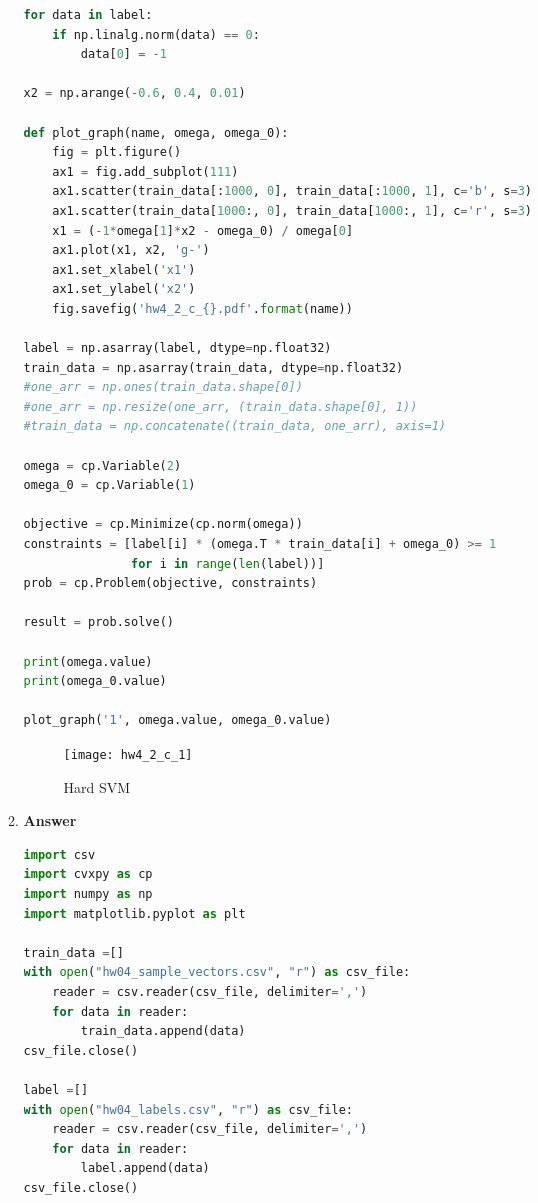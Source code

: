 \documentclass[11pt]{article}
\begin{document}
\begin{enumerate}[label=(\alph*)]
\begin{enumerate}[label=(\roman*)]
\begin{lstlisting}[language=Python, showstringspaces=false]
for data in label:
    if np.linalg.norm(data) == 0:
        data[0] = -1
        
x2 = np.arange(-0.6, 0.4, 0.01)
        
def plot_graph(name, omega, omega_0):
    fig = plt.figure()
    ax1 = fig.add_subplot(111)
    ax1.scatter(train_data[:1000, 0], train_data[:1000, 1], c='b', s=3)
    ax1.scatter(train_data[1000:, 0], train_data[1000:, 1], c='r', s=3)
    x1 = (-1*omega[1]*x2 - omega_0) / omega[0]
    ax1.plot(x1, x2, 'g-')
    ax1.set_xlabel('x1')
    ax1.set_ylabel('x2')
    fig.savefig('hw4_2_c_{}.pdf'.format(name))
        
label = np.asarray(label, dtype=np.float32)
train_data = np.asarray(train_data, dtype=np.float32)
#one_arr = np.ones(train_data.shape[0])
#one_arr = np.resize(one_arr, (train_data.shape[0], 1))
#train_data = np.concatenate((train_data, one_arr), axis=1)

omega = cp.Variable(2)
omega_0 = cp.Variable(1)

objective = cp.Minimize(cp.norm(omega))
constraints = [label[i] * (omega.T * train_data[i] + omega_0) >= 1  
               for i in range(len(label))]
prob = cp.Problem(objective, constraints)

result = prob.solve()

print(omega.value)
print(omega_0.value)

plot_graph('1', omega.value, omega_0.value)
\end{lstlisting}

\begin{figure}[H]
\centering
\texttt{[image: hw4\_2\_c\_1]}
\caption{Hard SVM}
\label{fig:hw4_2_c_1}
\end{figure}

\item  \textbf{Answer}

\begin{lstlisting}[language=Python, showstringspaces=false]
import csv
import cvxpy as cp
import numpy as np
import matplotlib.pyplot as plt

train_data =[]
with open("hw04_sample_vectors.csv", "r") as csv_file:
    reader = csv.reader(csv_file, delimiter=',')    
    for data in reader:
        train_data.append(data)        
csv_file.close()

label =[]
with open("hw04_labels.csv", "r") as csv_file:    
    reader = csv.reader(csv_file, delimiter=',')    
    for data in reader:
        label.append(data)        
csv_file.close()


\end{lstlisting}
\end{enumerate}
\end{enumerate}
\end{document}

